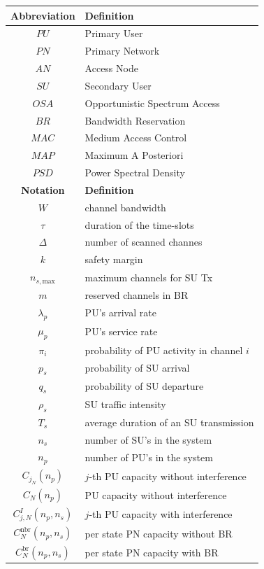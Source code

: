 \begin{table}
\begin{tabular}{|c|l|} \hline
\textbf{Abbreviation} & \textbf{Definition}\\\hline\hline
$PU$ & Primary User\\
$PN$ & Primary Network\\
$AN$ & Access Node\\
$SU$ & Secondary User\\
$OSA$ & Opportunistic Spectrum Access\\
$BR$ & Bandwidth Reservation\\
$MAC$ & Medium Access Control\\
$MAP$ & Maximum A Posteriori\\
$PSD$ & Power Spectral Density\\\hline\hline
\textbf{Notation} & \textbf{Definition}\\\hline\hline
$W$ & channel bandwidth\\
$\tau$ & duration of the time-slots\\
$\Delta$ & number of scanned channes\\
$k$ & safety margin\\
$n_{s,\text{max}}$ & maximum channels for SU Tx\\
$m$ & reserved channels in BR\\
$\lambda_{p}$ & PU's arrival rate\\
$\mu_{p}$ & PU's service rate\\
$\pi_{i}$ & probability of PU activity in channel $i$\\
$p_{s}$ & probability of SU arrival\\
$q_{s}$ & probability of SU departure\\
$\rho_{s}$ & SU traffic intensity\\
$T_{s}$ & average duration of an SU transmission\\
$n_{s}$	& number of SU's in the system\\
$n_{p}$	& number of PU's in the system\\
$C_{j_N}\left(n_{p}\right)$ & $j$-th PU capacity without interference\\
${C}_{N}\left(n_{p}\right)$ & PU capacity without interference\\
$C^{I}_{j,N}\left(n_{p},n_{s}\right)$ & $j$-th PU capacity with interference\\
$C^{\text{nbr}}_{N}\left(n_{p},n_{s}\right)$ & per state PN capacity without BR\\
$C^{\text{br}}_{N}\left(n_{p},n_{s}\right)$ & per state PN capacity with BR\\

\end{tabular}
\end{table}
